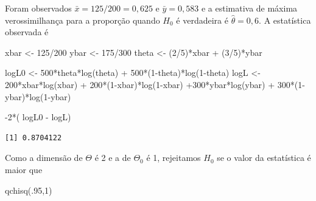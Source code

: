 \documentclass[
  letterpaper,
  DIV=11,
  numbers=noendperiod]{scrartcl}
\newenvironment{Shaded}{\begin{snugshade}}{\end{snugshade}}
\newcommand{\DecValTok}[1]{\textcolor[rgb]{0.68,0.00,0.00}{#1}}
\newcommand{\FunctionTok}[1]{\textcolor[rgb]{0.28,0.35,0.67}{#1}}
\newcommand{\NormalTok}[1]{\textcolor[rgb]{0.00,0.23,0.31}{#1}}
\newcommand{\OtherTok}[1]{\textcolor[rgb]{0.00,0.23,0.31}{#1}}
\newcommand{\SpecialCharTok}[1]{\textcolor[rgb]{0.37,0.37,0.37}{#1}}
\begin{document}
Foram observados \(\bar{x}=125/200=0,625\) e \(\bar{y}=0,583\) e a
estimativa de máxima verossimilhança para a proporção quando \(H_0\) é
verdadeira é \(\hat{\theta}=0,6\). A estatística observada é

\begin{Shaded}
\begin{Highlighting}[]
\NormalTok{xbar }\OtherTok{\textless{}{-}} \DecValTok{125}\SpecialCharTok{/}\DecValTok{200}
\NormalTok{ybar }\OtherTok{\textless{}{-}} \DecValTok{175}\SpecialCharTok{/}\DecValTok{300}
\NormalTok{theta }\OtherTok{\textless{}{-}}\NormalTok{ (}\DecValTok{2}\SpecialCharTok{/}\DecValTok{5}\NormalTok{)}\SpecialCharTok{*}\NormalTok{xbar }\SpecialCharTok{+}\NormalTok{ (}\DecValTok{3}\SpecialCharTok{/}\DecValTok{5}\NormalTok{)}\SpecialCharTok{*}\NormalTok{ybar}

\NormalTok{logL0 }\OtherTok{\textless{}{-}} \DecValTok{500}\SpecialCharTok{*}\NormalTok{theta}\SpecialCharTok{*}\FunctionTok{log}\NormalTok{(theta) }\SpecialCharTok{+} \DecValTok{500}\SpecialCharTok{*}\NormalTok{(}\DecValTok{1}\SpecialCharTok{{-}}\NormalTok{theta)}\SpecialCharTok{*}\FunctionTok{log}\NormalTok{(}\DecValTok{1}\SpecialCharTok{{-}}\NormalTok{theta)}
\NormalTok{logL }\OtherTok{\textless{}{-}} \DecValTok{200}\SpecialCharTok{*}\NormalTok{xbar}\SpecialCharTok{*}\FunctionTok{log}\NormalTok{(xbar) }\SpecialCharTok{+} \DecValTok{200}\SpecialCharTok{*}\NormalTok{(}\DecValTok{1}\SpecialCharTok{{-}}\NormalTok{xbar)}\SpecialCharTok{*}\FunctionTok{log}\NormalTok{(}\DecValTok{1}\SpecialCharTok{{-}}\NormalTok{xbar) }\SpecialCharTok{+}\DecValTok{300}\SpecialCharTok{*}\NormalTok{ybar}\SpecialCharTok{*}\FunctionTok{log}\NormalTok{(ybar) }\SpecialCharTok{+} \DecValTok{300}\SpecialCharTok{*}\NormalTok{(}\DecValTok{1}\SpecialCharTok{{-}}\NormalTok{ybar)}\SpecialCharTok{*}\FunctionTok{log}\NormalTok{(}\DecValTok{1}\SpecialCharTok{{-}}\NormalTok{ybar)}

\SpecialCharTok{{-}}\DecValTok{2}\SpecialCharTok{*}\NormalTok{( logL0 }\SpecialCharTok{{-}}\NormalTok{ logL)}
\end{Highlighting}
\end{Shaded}

\begin{verbatim}
[1] 0.8704122
\end{verbatim}

Como a dimensão de \(\Theta\) é 2 e a de \(\Theta_0\) é 1, rejeitamos
\(H_0\) se o valor da estatística é maior que

\begin{Shaded}
\begin{Highlighting}[]
\FunctionTok{qchisq}\NormalTok{(.}\DecValTok{95}\NormalTok{,}\DecValTok{1}\NormalTok{)}
\end{Highlighting}
\end{Shaded}
\end{document}
